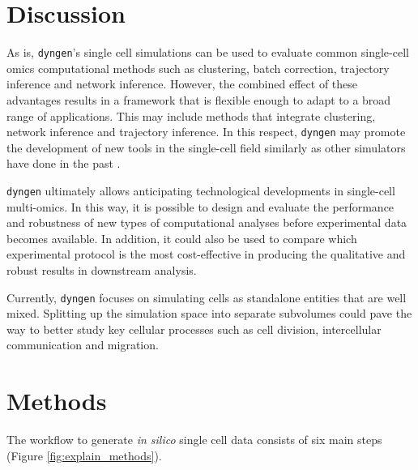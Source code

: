 \section{Discussion}
As is, \texttt{dyngen}'s single cell simulations can be used to evaluate common single-cell omics computational methods such as clustering, batch correction, trajectory inference and network inference.
However, the combined effect of these advantages results in a framework that is flexible enough to adapt to a broad range of applications. This may include methods that integrate clustering, network inference and trajectory inference. In this respect, \texttt{dyngen} may promote the development of new tools in the single-cell field similarly as other simulators have done in the past \cite{schaffter_genenetweaversilicobenchmark_2011,ewing_combiningtumorgenome_2015}.

\texttt{dyngen} ultimately allows anticipating technological developments in single-cell multi-omics. In this way, it is possible to design and evaluate the performance and robustness of new types of computational analyses before experimental data becomes available.
In addition, it could also be used to compare which experimental protocol is the most cost-effective in producing the qualitative and robust results in downstream analysis.

Currently, \texttt{dyngen} focuses on simulating cells as standalone entities that are well mixed.
Splitting up the simulation space into separate subvolumes could pave the way to better study key cellular processes such as cell division, intercellular communication and migration\cite{smith_spatialstochasticintracellular_2019}.


\section{Methods}
The workflow to generate \textit{in silico} single cell data consists of six main steps (Figure \ref{fig:explain_methods}). 

